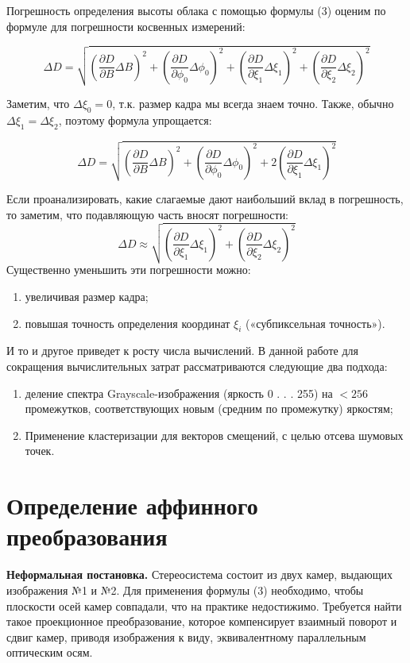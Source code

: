 \documentclass[11pt]{article} %
\begin{document}
	Погрешность определения высоты облака с помощью формулы (3) оценим по
	формуле для погрешности косвенных измерений:
	
	\[
	\Delta D = \sqrt{\left(\frac{\partial D}{\partial B} \Delta B\right)^2 + \left(\frac{\partial D}{\partial \phi_0} \Delta \phi_0\right)^2 + \left(\frac{\partial D}{\partial \xi_1} \Delta \xi_1\right)^2 + \left(\frac{\partial D}{\partial \xi_2} \Delta \xi_2\right)^2}
	\]
	
	Заметим, что $\Delta\xi_0 = 0$, т.к. размер кадра мы всегда знаем точно. Также,
	обычно $\Delta\xi_1 = \Delta\xi_2$, поэтому формула упрощается:
	
	\[
	\Delta D = \sqrt{\left(\frac{\partial D}{\partial B} \Delta B\right)^2 + \left(\frac{\partial D}{\partial \phi_0} \Delta \phi_0\right)^2 + 2\left(\frac{\partial D}{\partial \xi_1} \Delta \xi_1\right)^2}
	\]
	
	Если проанализировать, какие слагаемые дают наибольший вклад в погрешность, то заметим, что подавляющую часть вносят погрешности: 
	\[
	\Delta D \approx \sqrt{ \left( \frac{\partial D}{\partial \xi_1} \Delta \xi_1 \right)^2 + \left( \frac{\partial D}{\partial \xi_2} \Delta \xi_2 \right)^2}
	\]
	Существенно уменьшить эти погрешности можно:
	\begin{enumerate}
		\item увеличивая размер кадра;
		\item повышая точность определения координат $\xi_i$ («субпиксельная точность»).
	\end{enumerate}
	И то и другое приведет к росту числа вычислений. В данной работе для сокращения вычислительных затрат рассматриваются следующие два подхода:
	\begin{enumerate}
		\item деление спектра Grayscale-изображения (яркость 0 . . . 255) на $< 256$ промежутков, соответствующих новым (средним по промежутку) яркостям;
		\item Применение кластеризации для векторов смещений, с целью отсева шумовых точек.
	\end{enumerate}
	
	\pagebreak
	
\section{Определение аффинного преобразования}
\vspace{3mm}\hspace{5mm}

\textbf{Неформальная постановка.} Стереосистема состоит из двух камер, выдающих изображения №1 и №2. Для применения формулы (3) необходимо, чтобы плоскости осей камер совпадали, что на практике недостижимо. Требуется найти такое проекционное преобразование, которое компенсирует взаимный поворот и сдвиг камер, приводя изображения к виду, эквивалентному параллельным оптическим осям.
\end{document}
